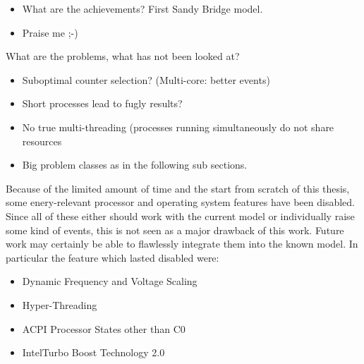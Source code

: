 
\begin{itemize}

\item What are the achievements? First Sandy Bridge model.

\item Praise me ;-)

\end{itemize}


\label{sec:problems}

What are the problems, what has not been looked at?

\begin{itemize}

\item Suboptimal counter selection? (Multi-core: better events)

\item Short processes lead to fugly results?

\item No true multi-threading (processes running simultaneously do not share
resources

\item Big problem classes as in the following sub sections.

\end{itemize}


\label{sec:no-advances-features}

Because of the limited amount of time and the start from scratch of this thesis,
some enery-relevant processor and operating system features have been disabled.
Since all of these either should work with the current model or individually
raise some kind of events, this is not seen as a major drawback of this work.
Future work may certainly be able to flawlessly integrate them into the known
model. In particular the feature which lasted disabled were:

\begin{itemize}

\item Dynamic Frequency and Voltage Scaling \cite{wiki:DVFS}

\item Hyper-Threading \cite{wiki:HT}

\item ACPI Processor States other than C0 \cite{wiki:ACPI}

\item Intel\TReg Turbo Boost Technology 2.0 \cite{wiki:IntelTurboBoost}

\end{itemize}


